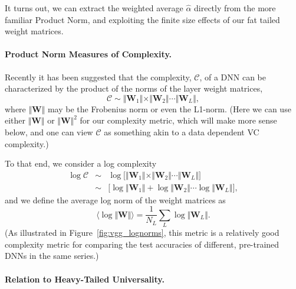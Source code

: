 It turns out, we can extract the weighted average $\hat{\alpha}$ directly from the more familiar Product Norm, and exploiting the finite size effects of our fat tailed weight matrices.




\paragraph{Product Norm Measures of Complexity.} 

Recently it has been suggested that the complexity, $\mathcal{C}$, of a DNN can be characterized by the product of the norms of the layer weight matrices,
$$
\mathcal{C}\sim\Vert\mathbf{W}_{1}\Vert\times\Vert\mathbf{W}_{2}\Vert\cdots\Vert\mathbf{W}_{L}\Vert ,
$$
where $\Vert\mathbf{W}\Vert$ may be the Frobenius norm or even the L1-norm. 
(Here we can use either $\Vert\mathbf{W}\Vert$ or $\Vert\mathbf{W}\Vert^{2}$ for our complexity metric, which will make more sense below, and one can view $\mathcal{C}$ as something akin to a data dependent VC complexity.)

To that end, we consider a log complexity
\begin{eqnarray*}
\log\mathcal{C} &\sim& \log\bigg[\Vert\mathbf{W}_{1}\Vert\times\Vert\mathbf{W}_{2}\Vert\cdots\Vert\mathbf{W}_{L}\Vert\bigg]  \\
                &\sim& \bigg[\log\Vert\mathbf{W}_{1}\Vert+\log\Vert\mathbf{W}_{2}\Vert\cdots\log\Vert\mathbf{W}_{L}\Vert\bigg]  ,
\end{eqnarray*}
and we define the average log norm of the weight matrices as
$$
\langle\log\Vert\mathbf{W}\Vert\rangle=\dfrac{1}{N_{L}}\sum_{L}\log\Vert\mathbf{W}_{L}\Vert  .
$$
(As illustrated in Figure~\ref{fig:vgg_lognorms}, this metric is a relatively good complexity metric for comparing the test accuracies of different, pre-trained DNNs in the same series.)


\paragraph{Relation to Heavy-Tailed Universality.} 

